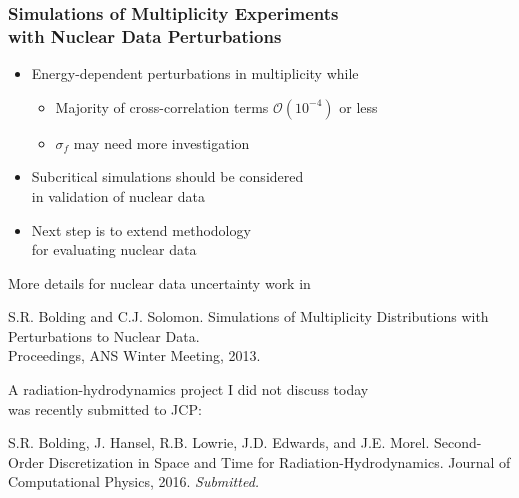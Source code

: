 \begin{frame}
\frametitle{Simulations of Multiplicity Experiments \\ with Nuclear Data Perturbations}
	\vspace{-0.2in}
\begin{itemize}
    \item[] Energy-dependent \nubar perturbations  in multiplicity while  \keff
      \begin{itemize}\vspace{0.1in}
		\item Majority of cross-correlation terms $\mathcal{O}(10^{-4})$ or less
            \vspace{-0.1in}
        \item $\sigma_f$ may need more investigation
            \\ 
	  \end{itemize}
      \item[] Subcritical simulations should be considered \\ in validation of nuclear data
      \item[] Next step is to extend methodology \\ for evaluating nuclear data
  \end{itemize}
\end{frame} 

\begin{frame}
    More details for nuclear data uncertainty work in
    \begin{tcolorbox}
    S.R. Bolding and C.J. Solomon. 
    Simulations of Multiplicity Distributions with Perturbations to
    Nuclear Data.\\ Proceedings, ANS Winter Meeting, 2013.
    \end{tcolorbox}
    \vspace{0.3in}
    A radiation-hydrodynamics project I did not discuss today  \\ was recently submitted
    to JCP:
    \begin{tcolorbox}
    S.R. Bolding, J. Hansel, R.B. Lowrie, J.D. Edwards, and J.E. Morel. Second-Order
    Discretization in Space and Time for Radiation-Hydrodynamics. Journal of Computational
    Physics, 2016. \emph{Submitted.}
    \end{tcolorbox}
\end{frame}


